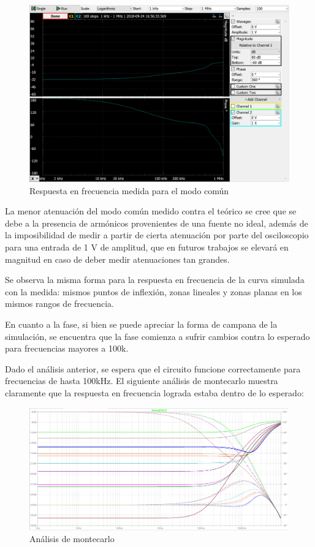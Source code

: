 \documentclass[../../tc_tp3_main.tex]{subfiles}
\begin{document}
		\begin{figure}[h!]	
		\centering
		\includegraphics[scale=0.6]{imagenes/bode_comun_medido.png}
		\caption{Respuesta en frecuencia medida para el modo común}
		\label{fig:ej3_bode_comun_medido}
	\end{figure}
	La menor atenuación del modo común medido contra el teórico se cree que se debe a la presencia de armónicos provenientes de una fuente no ideal, además de la imposibilidad de medir a partir de cierta atenuación por parte del osciloscopio para una entrada de 1 V de amplitud, que en futuros trabajos se elevará en magnitud en caso de deber medir atenuaciones tan grandes.\par
	Se observa la misma forma para la respuesta en frecuencia de la curva simulada con la medida: mismos puntos de inflexión, zonas lineales y zonas planas en los mismos rangos de frecuencia.\par
	En cuanto a la fase,  si bien se puede apreciar la forma de campana de la simulación, se encuentra que la fase comienza a sufrir cambios contra lo esperado para frecuencias mayores a 100k. \par
	Dado el análisis anterior, se espera que el circuito funcione correctamente para frecuencias de hasta 100kHz.
	El siguiente análisis de montecarlo muestra claramente que la respuesta en frecuencia lograda estaba dentro de lo esperado:
	
			\begin{figure}[h!]	
		\centering
		\includegraphics[scale=0.4]{imagenes/bode_comun_montecarlo.png}
		\caption{Análisis de montecarlo}
		\label{fig:ej3_bode_comun_medido}
	\end{figure}
	
\end{document}
